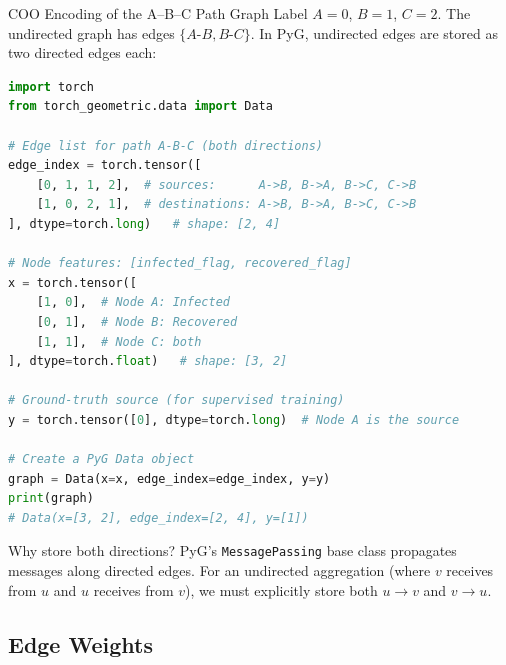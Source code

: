 \begin{examplebox}{COO Encoding of the A--B--C Path Graph}
Label $A=0$, $B=1$, $C=2$. The undirected graph has edges $\{A\text{-}B, B\text{-}C\}$. In PyG, undirected edges are stored as two directed edges each:

\begin{center}
\end{center}

\begin{lstlisting}[language=Python]
import torch
from torch_geometric.data import Data

# Edge list for path A-B-C (both directions)
edge_index = torch.tensor([
    [0, 1, 1, 2],  # sources:      A->B, B->A, B->C, C->B
    [1, 0, 2, 1],  # destinations: A->B, B->A, B->C, C->B
], dtype=torch.long)   # shape: [2, 4]

# Node features: [infected_flag, recovered_flag]
x = torch.tensor([
    [1, 0],  # Node A: Infected
    [0, 1],  # Node B: Recovered
    [1, 1],  # Node C: both
], dtype=torch.float)   # shape: [3, 2]

# Ground-truth source (for supervised training)
y = torch.tensor([0], dtype=torch.long)  # Node A is the source

# Create a PyG Data object
graph = Data(x=x, edge_index=edge_index, y=y)
print(graph)
# Data(x=[3, 2], edge_index=[2, 4], y=[1])
\end{lstlisting}

Why store both directions? PyG's \texttt{MessagePassing} base class propagates messages along directed edges. For an undirected aggregation (where $v$ receives from $u$ and $u$ receives from $v$), we must explicitly store both $u \to v$ and $v \to u$.
\end{examplebox}

\subsection{Edge Weights}

